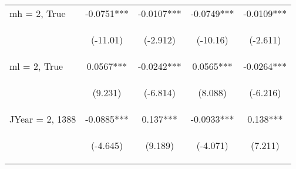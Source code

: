\documentclass[]{standalone}
\begin{document}
\begin{tabular}{lcccc}
    mh = 2, True     & -0.0751***                                     & -0.0107***                                     & -0.0749***                                     & -0.0109***                                     \\
    \vspace{4pt}     & \begin{footnotesize}(-11.01)\end{footnotesize} & \begin{footnotesize}(-2.912)\end{footnotesize} & \begin{footnotesize}(-10.16)\end{footnotesize} & \begin{footnotesize}(-2.611)\end{footnotesize} \\
    ml = 2, True     & 0.0567***                                      & -0.0242***                                     & 0.0565***                                      & -0.0264***                                     \\
    \vspace{4pt}     & \begin{footnotesize}(9.231)\end{footnotesize}  & \begin{footnotesize}(-6.814)\end{footnotesize} & \begin{footnotesize}(8.088)\end{footnotesize}  & \begin{footnotesize}(-6.216)\end{footnotesize} \\
    JYear = 2, 1388  & -0.0885***                                     & 0.137***                                       & -0.0933***                                     & 0.138***                                       \\
    \vspace{4pt}     & \begin{footnotesize}(-4.645)\end{footnotesize} & \begin{footnotesize}(9.189)\end{footnotesize}  & \begin{footnotesize}(-4.071)\end{footnotesize} & \begin{footnotesize}(7.211)\end{footnotesize}  \\

\end{tabular}
\end{document}
